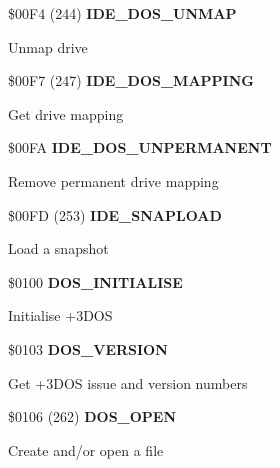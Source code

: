 \$00F4 (244) \textbf{IDE\_DOS\_UNMAP}

Unmap drive

%

\$00F7 (247) \textbf{IDE\_DOS\_MAPPING}

Get drive mapping


\$00FA \textbf{IDE\_DOS\_UNPERMANENT}

Remove permanent drive mapping

\$00FD (253) \textbf{IDE\_SNAPLOAD}

Load a snapshot

%

\$0100 \textbf{DOS\_INITIALISE}

Initialise +3DOS

\$0103 \textbf{DOS\_VERSION}

Get +3DOS issue and version numbers

\$0106 (262) \textbf{DOS\_OPEN}

Create and/or open a file

